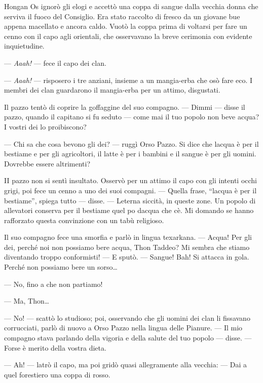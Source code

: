 Hongan Os ignorò gli elogi e accettò una coppa di sangue dalla vecchia
donna che serviva il fuoco del Consiglio. Era stato raccolto di fresco
da un giovane bue appena macellato e ancora caldo. Vuotò la coppa prima
di voltarsi per fare un cenno con il capo agli orientali, che
osservavano la breve cerimonia con evidente inquietudine.

--- \emph{Aaah!} --- fece il capo dei clan.

--- \emph{Aaah!} --- risposero i tre anziani, insieme a un mangia-erba
che osò fare eco. I membri dei clan guardarono il mangia-erba per un
attimo, disgustati.

Il pazzo tentò di coprire la goffaggine del suo compagno. --- Dimmi ---
disse il pazzo, quando il capitano si fu seduto --- come mai il tuo
popolo non beve acqua? I vostri dei lo proibiscono?

--- Chi sa che cosa bevono gli dei? --- ruggì Orso Pazzo. Si dice che
l\textquotesingle acqua è per il bestiame e per gli agricoltori, il
latte è per i bambini e il sangue è per gli uomini. Dovrebbe essere
altrimenti?

II pazzo non si sentì insultato. Osservò per un attimo il capo con gli
intenti occhi grigi, poi fece un cenno a uno dei suoi compagni. ---
Quella frase, ``l\textquotesingle acqua è per il bestiame'', spiega
tutto --- disse. --- L\textquotesingle eterna siccità, in queste zone.
Un popolo di allevatori conserva per il bestiame quel
po\textquotesingle{} d\textquotesingle acqua che c\textquotesingle è. Mi
domando se hanno rafforzato questa convinzione con un tabù religioso.

Il suo compagno fece una smorfia e parlò in lingua texarkana. --- Acqua!
Per gli dei, perché noi non possiamo bere acqua, Thon Taddeo? Mi sembra
che stiamo diventando troppo conformisti! --- E sputò. --- Sangue! Bah!
Si attacca in gola. Perché non possiamo bere un sorso\ldots{}

--- No, fino a che non partiamo!

--- Ma, Thon\ldots{}

--- No! --- scattò lo studioso; poi, osservando che gli uomini dei clan
li fissavano corrucciati, parlò di nuovo a Orso Pazzo nella lingua delle
Pianure. --- Il mio compagno stava parlando della vigoria e della salute
del tuo popolo --- disse. --- Forse è merito della vostra dieta.

--- Ah! --- latrò il capo, ma poi gridò quasi allegramente alla vecchia:
--- Dai a quel forestiero una coppa di rosso.

